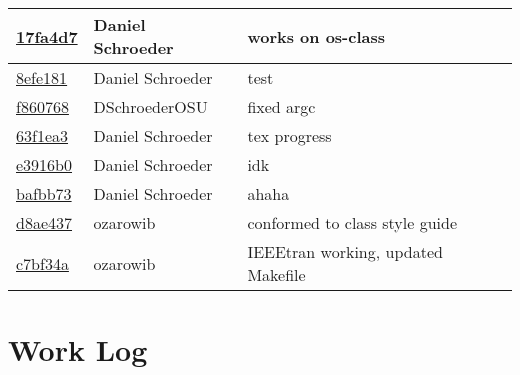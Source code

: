 \documentclass[10pt,letterpaper,draftclsnofoot,onecolumn]{IEEEtran}
\begin{document}
\begin{tabular}{l l l}
\href{https://github.com/DSchroederOSU/CS444-Group\_11\_05/commit/17fa4d7daa607f5a8466d4c854083fe763728c40}{17fa4d7} & Daniel Schroeder & works on os-class\\\hline
\href{https://github.com/DSchroederOSU/CS444-Group\_11\_05/commit/8efe18126d63f4c3156da70cb6e8d6f3bb95dcf6}{8efe181} & Daniel Schroeder & test\\\hline
\href{https://github.com/DSchroederOSU/CS444-Group\_11\_05/commit/f86076889a02b98fd55cc73c537e49ce93315ea4}{f860768} & DSchroederOSU & fixed argc\\\hline
\href{https://github.com/DSchroederOSU/CS444-Group\_11\_05/commit/63f1ea3079fb2044a5fd16f4f60ed0afcecbca13}{63f1ea3} & Daniel Schroeder & tex progress\\\hline
\href{https://github.com/DSchroederOSU/CS444-Group\_11\_05/commit/e3916b0f556dc4093d8689662850a7ac1a0a3e71}{e3916b0} & Daniel Schroeder & idk\\\hline
\href{https://github.com/DSchroederOSU/CS444-Group\_11\_05/commit/bafbb7390e8525a17d2ad32ccd003c800ed0b4f0}{bafbb73} & Daniel Schroeder & ahaha\\\hline
\href{https://github.com/DSchroederOSU/CS444-Group\_11\_05/commit/d8ae437d3f4dffe4287eab3471225d489f16af0a}{d8ae437} & ozarowib & conformed to class style guide\\\hline
\href{https://github.com/DSchroederOSU/CS444-Group\_11\_05/commit/c7bf34a5a0bdc36bfc9815bdf012847cb9b6b3da}{c7bf34a} & ozarowib & IEEEtran working, updated Makefile\\\hline\end{tabular}
\bigskip

\section{Work Log}
\bigskip
\end{document}
